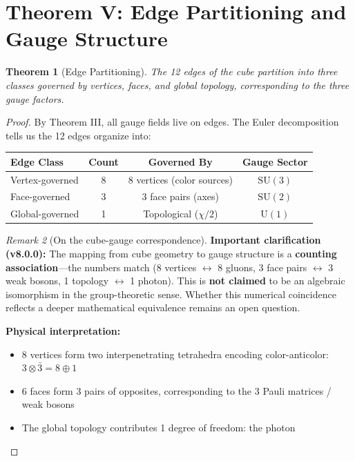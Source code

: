 \documentclass[11pt,a4paper]{article}
\theoremstyle{plain}
\newtheorem{theorem}{Theorem}[section]
\theoremstyle{definition}
\theoremstyle{remark}
\newtheorem{remark}[theorem]{Remark}
\newcommand{\SUthree}{\text{SU}(3)}
\newcommand{\SUtwo}{\text{SU}(2)}
\newcommand{\Uone}{\text{U}(1)}
\begin{document}
\section{Theorem V: Edge Partitioning and Gauge Structure}

\begin{theorem}[Edge Partitioning]
The 12 edges of the cube partition into three classes governed by vertices, faces, and global topology, corresponding to the three gauge factors.
\end{theorem}

\begin{proof}
By Theorem III, all gauge fields live on edges. The Euler decomposition tells us the 12 edges organize into:

\begin{center}
\begin{tabular}{lccc}
\toprule
\textbf{Edge Class} & \textbf{Count} & \textbf{Governed By} & \textbf{Gauge Sector} \\
\midrule
Vertex-governed & 8 & 8 vertices (color sources) & $\SUthree$ \\
Face-governed & 3 & 3 face pairs (axes) & $\SUtwo$ \\
Global-governed & 1 & Topological ($\chi/2$) & $\Uone$ \\
\bottomrule
\end{tabular}
\end{center}

\begin{remark}[On the cube-gauge correspondence]
\textbf{Important clarification (v8.0.0):} The mapping from cube geometry to gauge structure is a \textbf{counting association}---the numbers match (8 vertices $\leftrightarrow$ 8 gluons, 3 face pairs $\leftrightarrow$ 3 weak bosons, 1 topology $\leftrightarrow$ 1 photon). This is \textbf{not claimed} to be an algebraic isomorphism in the group-theoretic sense. Whether this numerical coincidence reflects a deeper mathematical equivalence remains an open question.
\end{remark}

\textbf{Physical interpretation:}
\begin{itemize}
  \item 8 vertices form two interpenetrating tetrahedra encoding color-anticolor: $3 \otimes \bar{3} = 8 \oplus 1$
  \item 6 faces form 3 pairs of opposites, corresponding to the 3 Pauli matrices / weak bosons
  \item The global topology contributes 1 degree of freedom: the photon
\end{itemize}
\end{proof}
\end{document}

